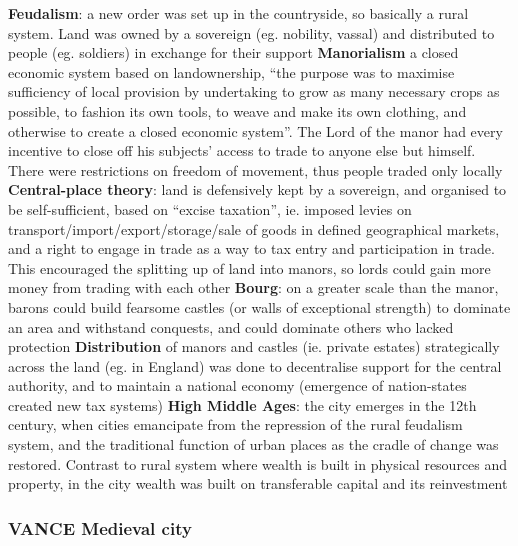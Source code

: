 \documentclass{article}
\begin{document}
\begin{outline}
	\1 \textbf{Feudalism}: a new order was set up in the countryside, so basically a rural system. Land was owned by a sovereign (eg. nobility, vassal) and distributed to people (eg. soldiers) in exchange for their support
		\2 \textbf{Manorialism} a closed economic system based on landownership, ``the purpose was to maximise sufficiency of local provision by undertaking to grow as many necessary crops as possible, to fashion its own tools, to weave and make its own clothing, and otherwise to create a closed economic system''. The Lord of the manor had every incentive to close off his subjects' access to trade to anyone else but himself. There were restrictions on freedom of movement, thus people traded only locally
		\2 \textbf{Central-place theory}: land is defensively kept by a sovereign, and organised to be self-sufficient, based on ``excise taxation'', ie. imposed levies on transport/import/export/storage/sale of goods in defined geographical markets, and a right to engage in trade as a way to tax entry and participation in trade. This encouraged the splitting up of land into manors, so lords could gain more money from trading with each other
		\2 \textbf{Bourg}: on a greater scale than the manor, barons could build fearsome castles (or walls of exceptional strength) to dominate an area and withstand conquests, and could dominate others who lacked protection
		\2 \textbf{Distribution} of manors and castles (ie. private estates) strategically across the land (eg. in England) was done to decentralise support for the central authority, and to maintain a national economy (emergence of nation-states created new tax systems)
	\1 \textbf{High Middle Ages}: the city emerges in the 12th century, when cities emancipate from the repression of the rural feudalism system, and the traditional function of urban places as the cradle of change was restored. Contrast to rural system where wealth is built in physical resources and property, in the city wealth was built on transferable capital and its reinvestment
\end{outline}

\subsubsection{VANCE Medieval city}
\end{document}
